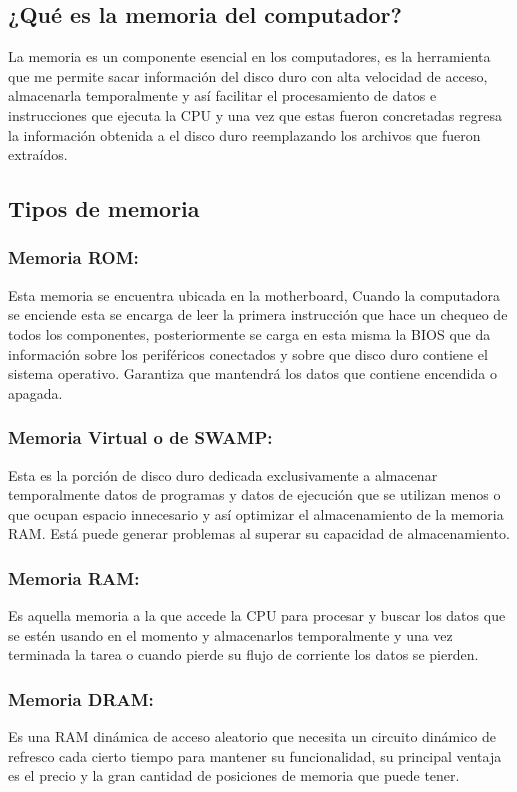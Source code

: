 \documentclass{article}
\begin{document}
\subsection{¿Qué es la memoria del computador?}
La memoria es un componente esencial en los computadores, es la herramienta que me permite sacar información del disco duro con alta velocidad de acceso, almacenarla temporalmente y así facilitar el procesamiento de datos e instrucciones que ejecuta la CPU y una vez que estas fueron concretadas regresa la información obtenida a el disco duro reemplazando los archivos que fueron extraídos.
\subsection{Tipos de memoria}
\subsubsection{Memoria ROM:}
Esta memoria se encuentra ubicada en la motherboard, Cuando la computadora se enciende esta se encarga de leer la primera instrucción que hace un chequeo de todos los componentes, posteriormente se carga en esta misma la BIOS que da información sobre los periféricos conectados y sobre que disco duro contiene el sistema operativo. Garantiza que mantendrá los datos que contiene encendida o apagada.
\subsubsection{Memoria Virtual o de SWAMP:}
Esta es la porción de disco duro dedicada exclusivamente a almacenar temporalmente datos de programas y datos de ejecución que se utilizan menos o que ocupan espacio innecesario y así optimizar el almacenamiento de la memoria RAM. Está puede generar problemas al superar su capacidad de almacenamiento.
\subsubsection{Memoria RAM:}
Es aquella memoria a la que accede la CPU para procesar y buscar los datos que se estén usando en el momento y almacenarlos temporalmente y una vez terminada la tarea o cuando pierde su flujo de corriente los datos se pierden.
\subsubsection{Memoria DRAM:}
Es una RAM dinámica de acceso aleatorio que necesita un circuito dinámico de refresco cada cierto tiempo para mantener su funcionalidad, su principal ventaja es el precio y la gran cantidad de posiciones de memoria que puede tener.
\end{document}
